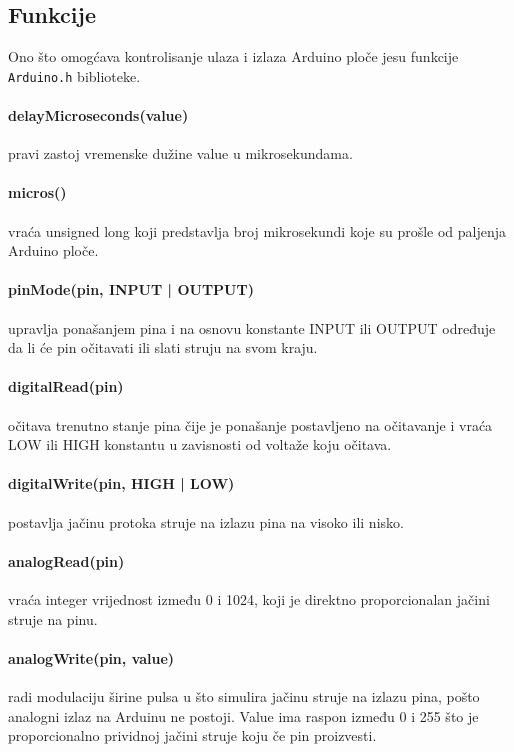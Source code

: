 \documentclass[../Document.tex]{subfiles}
\begin{document}
\subsection{Funkcije}\label{funkcije}

Ono što omogćava kontrolisanje ulaza i izlaza Arduino ploče jesu funkcije \verb|Arduino.h| biblioteke.

\paragraph{delayMicroseconds(value)} pravi zastoj vremenske dužine value u mikrosekundama.

\paragraph{micros()} vraća unsigned long koji predstavlja broj mikrosekundi koje su prošle od paljenja Arduino ploče.

\paragraph{pinMode(pin, INPUT | OUTPUT)} upravlja ponašanjem pina i na osnovu konstante INPUT ili OUTPUT određuje da li će pin očitavati ili slati struju na svom kraju.

\paragraph{digitalRead(pin)} očitava trenutno stanje pina čije je ponašanje postavljeno na očitavanje i vraća LOW ili HIGH konstantu u zavisnosti od voltaže koju očitava.

\paragraph{digitalWrite(pin, HIGH | LOW)} postavlja jačinu protoka struje na izlazu pina na visoko ili nisko.

\paragraph{analogRead(pin)} vraća integer vrijednost između 0 i 1024, koji je direktno proporcionalan jačini struje na pinu.

\paragraph{analogWrite(pin, value)} radi modulaciju širine pulsa u što simulira jačinu struje na izlazu pina, pošto analogni izlaz na Arduinu ne postoji. Value ima raspon između 0 i 255 što je proporcionalno prividnoj jačini struje koju če pin proizvesti.
\end{document}
